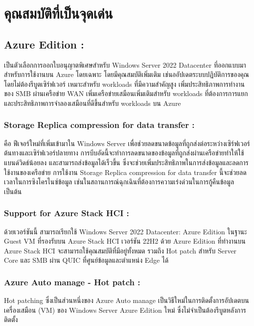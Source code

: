 \section{คุณสมบัติที่เป็นจุดเด่น}

\hspace{0cm}\subsection{Azure Edition : } เป็นตัวเลือกการออกใบอนุญาตพิเศษสำหรับ Windows Server 2022 Datacenter ที่ออกแบบมาสำหรับการใช้งานบน Azure โดยเฉพาะ
โดยมีคุณสมบัติเพิ่มเติม เช่นออัปเดตระบบปฏิบัติการของคุณโดยไม่ต้องรีบูตเซิร์ฟเวอร์ เหมาะสำหรับ workloads ที่มีความสำคัญสูง เพิ่มประสิทธิภาพการทำงานของ SMB ผ่านเครือข่าย WAN เพิ่มเครือข่ายเสมือนเพิ่มเติมสำหรับ workloads ที่ต้องการการแยกและประสิทธิภาพการจำลองเสมือนที่ดีขึ้นสำหรับ workloads บน Azure \cite{2022:3}

\hspace{1cm}\subsubsection{Storage Replica compression for data transfer : }  คือ ฟีเจอร์ใหม่ที่เพิ่มเข้ามาใน Windows Server เพื่อช่วยลดขนาดข้อมูลที่ถูกส่งต่อระหว่างเซิร์ฟเวอร์ต้นทางและเซิร์ฟเวอร์ปลายทาง การบีบอัดนี้จะทำการลดขนาดของข้อมูลที่ถูกส่งผ่านเครือข่ายทำให้ใช้แบนด์วิดธ์น้อยลง และสามารถส่งข้อมูลได้เร็วขึ้น ซึ่งจะช่วยเพิ่มประสิทธิภาพในการส่งข้อมูลและลดการใช้งานของเครือข่าย การใช้งาน Storage Replica compression for data transfer นี้จะช่วยลดเวลาในการซิงโครไนซ์ข้อมูล เช่นในสถานการณ์ฉุกเฉินที่ต้องการความเร่งด่วนในการกู้คืนข้อมูล เป็นต้น

\hspace{1cm}\subsubsection{Support for Azure Stack HCI : } ด้วยเวอร์ชันนี้ สามารถเรียกใช้ Windows Server 2022 Datacenter: Azure Edition ในฐานะ Guest VM ที่รองรับบน Azure Stack HCI เวอร์ชัน 22H2 ด้วย Azure Edition ที่ทำงานบน Azure Stack HCI จะสามารถใช้คุณสมบัติที่มีอยู่ทั้งหมด รวมถึง Hot patch สำหรับ Server Core และ SMB ผ่าน QUIC ที่ศูนย์ข้อมูลและตำแหน่ง Edge ได้

\hspace{1cm}\subsubsection{Azure Auto manage - Hot patch : } Hot patching ซึ่งเป็นส่วนหนึ่งของ Azure Auto manage เป็นวิธีใหม่ในการติดตั้งการอัปเดตบนเครื่องเสมือน (VM) ของ Windows Server Azure Edition ใหม่ ซึ่งไม่จำเป็นต้องรีบูตหลังการติดตั้ง 

